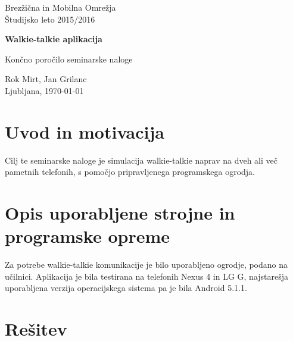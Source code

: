 \documentclass[11pt,a4paper,slovene]{article}
\begin{document}
\label{naslov}
\thispagestyle{empty}

\begin{center}
\begin{Large}
Brez\v{z}i\v{c}na in Mobilna Omre\v{z}ja\\
Študijsko leto 2015/2016\\
\end{Large}

\vspace*{4cm}
\begin{LARGE}
\textbf{Walkie-talkie aplikacija\\}
\end{LARGE}
\vspace*{0.5cm}

\begin{Large}
Končno poročilo seminarske naloge\\

\vspace*{4cm}

Rok Mirt, Jan Grilanc\\

\vspace*{5cm}
Ljubljana, \today
\end{Large}
\end{center}

\pagebreak
\setcounter{page}{1}


\label{Kazalo}
\tableofcontents
\thispagestyle{empty}
\pagebreak

\section{Uvod in motivacija}
Cilj te seminarske naloge je simulacija walkie-talkie naprav na dveh ali več pametnih telefonih, s pomočjo pripravljenega programskega ogrodja.

\section{Opis uporabljene strojne in programske opreme}
Za potrebe walkie-talkie komunikacije je bilo uporabljeno ogrodje, podano na učilnici. Aplikacija je bila testirana na telefonih Nexus 4 in LG G, najstarešja uporabljena verzija operacijskega sistema pa je bila Android 5.1.1.

\section{Rešitev}
\end{document}
